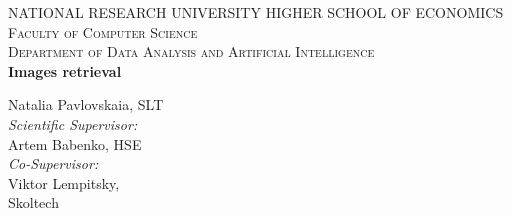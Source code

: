 \documentclass[a4paper,12pt]{extreport}
\begin{document}
    \begin{titlepage}

        \newcommand{\HRule}{\rule{\linewidth}{0.5mm}} %

        \center %


        \textsc{\LARGE NATIONAL RESEARCH UNIVERSITY HIGHER SCHOOL OF ECONOMICS}\\[1.5cm] %
        \textsc{\Large Faculty of Computer Science}\\[0.5cm] %
        \textsc{\large Department of Data Analysis and Artificial Intelligence}\\[2.7cm] %


        { \huge \bfseries Images retrieval}\\[2.6cm] %



        \begin{flushright}
            \large
            Natalia Pavlovskaia, SLT\\[1cm] %

            \emph{Scientific Supervisor:} \\
            Artem Babenko,
            HSE\\[1cm]%

            \emph{Co-Supervisor:} \\
            Viktor Lempitsky,\\
            Skoltech \\[2.5cm]
        \end{flushright}




\end{titlepage}
\end{document}
